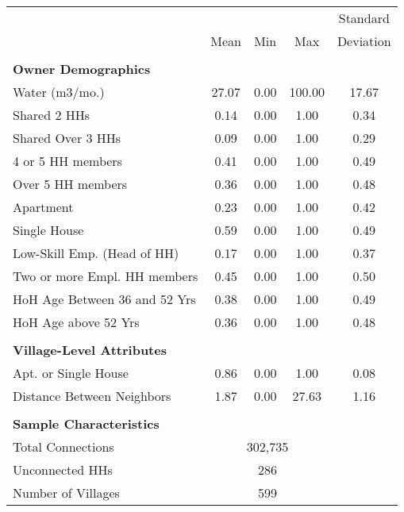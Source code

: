 \begin{tabular}{l*{1}{cccc}}
 & & & &Standard  \\
 &Mean &Min &Max &Deviation  \\
\hline \\
\textbf{Owner Demographics} &\multicolumn{4}{c}{ }\\
\hline
Water (m3/mo.) &      27.07  &       0.00  &     100.00  &      17.67   \\
Shared 2 HHs &       0.14  &       0.00  &       1.00  &       0.34   \\
Shared Over 3 HHs &       0.09  &       0.00  &       1.00  &       0.29   \\
4 or 5 HH members &       0.41  &       0.00  &       1.00  &       0.49   \\
Over 5 HH members &       0.36  &       0.00  &       1.00  &       0.48   \\
Apartment &       0.23  &       0.00  &       1.00  &       0.42   \\
Single House &       0.59  &       0.00  &       1.00  &       0.49   \\
Low-Skill Emp. (Head of HH) &       0.17  &       0.00  &       1.00  &       0.37   \\
Two or more Empl. HH members &       0.45  &       0.00  &       1.00  &       0.50   \\
HoH Age Between 36 and 52 Yrs &       0.38  &       0.00  &       1.00  &       0.49   \\
HoH Age above 52 Yrs &       0.36  &       0.00  &       1.00  &       0.48   \\
\hline \\
\textbf{Village-Level Attributes} &\multicolumn{4}{c}{ }\\
\hline
Apt. or Single House &       0.86  &       0.00  &       1.00  &       0.08   \\
Distance Between Neighbors &       1.87  &       0.00  &      27.63  &       1.16   \\
\hline \\
\textbf{Sample Characteristics} &\multicolumn{4}{c}{ }\\
\hline
 Total Connections &\multicolumn{3}{c}{302,735 }\\
 Unconnected HHs &\multicolumn{3}{c}{286 }\\
 Number of Villages &\multicolumn{3}{c}{599 }\\
\hline
\hline
\end{tabular}